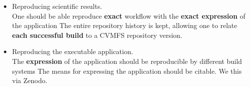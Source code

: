 \documentclass[17pt, a0paper, landscape, margin=0mm, innermargin=15mm,
     blockverticalspace=5mm, colspace=5mm, subcolspace=8mm]{tikzposter} %
\begin{document}
\begin{columns}
{\begin{itemize}
                 \item Reproducing scientific results. \\
                         One should be able reproduce \textbf{exact} workflow with the \textbf{exact expression} of the application
                         The entire repository history is kept, allowing one to relate \textbf{each successful build} to a CVMFS repository version.
                 \item Reproducing the executable application.\\
                         The \textbf{expression} of the application should be reproducible by different build systems
                          The means for expressing the application should be citable. We this via Zenodo.
             \end{itemize}
        }
    
     \end{columns}
\end{document}
